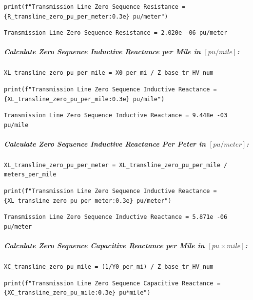 \begin{verbatim}
print(f"Transmission Line Zero Sequence Resistance = {R_transline_zero_pu_per_meter:0.3e} pu/meter")
\end{verbatim}

\begin{verbatim}
Transmission Line Zero Sequence Resistance = 2.020e -06 pu/meter
\end{verbatim}

\subparagraph{Calculate Zero Sequence Inductive Reactance per Mile in $\left[pu/mile\right]$:}

\begin{verbatim}
XL_transline_zero_pu_per_mile = X0_per_mi / Z_base_tr_HV_num
\end{verbatim}

\begin{verbatim}
print(f"Transmission Line Zero Sequence Inductive Reactance = {XL_transline_zero_pu_per_mile:0.3e} pu/mile")
\end{verbatim}

\begin{verbatim}
Transmission Line Zero Sequence Inductive Reactance = 9.448e -03 pu/mile
\end{verbatim}

\subparagraph{Calculate Zero Sequence Inductive Reactance Per Peter in $\left[pu/meter\right]$:}

\begin{verbatim}
XL_transline_zero_pu_per_meter = XL_transline_zero_pu_per_mile / meters_per_mile
\end{verbatim}

\begin{verbatim}
print(f"Transmission Line Zero Sequence Inductive Reactance = {XL_transline_zero_pu_per_meter:0.3e} pu/meter")
\end{verbatim}

\begin{verbatim}
Transmission Line Zero Sequence Inductive Reactance = 5.871e -06 pu/meter
\end{verbatim}

\subparagraph{Calculate Zero Sequence Capacitive Reactance per Mile in $\left[pu \times mile\right]$:}

\begin{verbatim}
XC_transline_zero_pu_mile = (1/Y0_per_mi) / Z_base_tr_HV_num
\end{verbatim}

\begin{verbatim}
print(f"Transmission Line Zero Sequence Capacitive Reactance = {XC_transline_zero_pu_mile:0.3e} pu*mile")
\end{verbatim}

